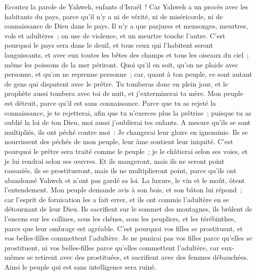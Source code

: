 \begin{multicols}{2}
\VerseOne{}Ecoutez la parole de Yahweh, enfants d'Israël~! Car Yahweh a un procès avec les habitants du pays, parce qu'il n'y a ni de vérité, ni de miséricorde, ni de connaissance de Dieu dans le pays.
Il n'y a que parjures et mensonges, meurtres, vols et adultères~; on use de violence, et un meurtre touche l'autre.
C'est pourquoi le pays sera dans le deuil, et tous ceux qui l'habitent seront languissants, et avec eux toutes les bêtes des champs et tous les oiseaux du ciel~; même les poissons de la mer périront.
Quoi qu'il en soit, qu'on ne plaide avec personne, et qu'on ne reprenne personne~; car, quant à ton peuple, ce sont autant de gens qui disputent avec le prêtre.
Tu tomberas donc en plein jour, et le prophète aussi tombera avec toi de nuit, et j'exterminerai ta mère.
Mon peuple est détruit, parce qu'il est sans connaissance. Parce que tu as rejeté la connaissance, je te rejetterai, afin que tu n'exerces plus la prêtrise~; puisque tu as oublié la loi de ton Dieu, moi aussi j'oublierai tes enfants.
A mesure qu'ils se sont multipliés, ils ont péché contre moi~: Je changerai leur gloire en ignominie.
Ils se nourrissent des péchés de mon peuple, leur âme soutient leur iniquité.
C'est pourquoi le prêtre sera traité comme le peuple~; je le châtierai selon ses voies, et je lui rendrai selon ses œuvres.
Et ils mangeront, mais ils ne seront point rassasiés, ils se prostitueront, mais ils ne multiplieront point, parce qu'ils ont abandonné Yahweh et n'ont pas gardé sa loi.
La luxure, le vin et le moût, ôtent l'entendement.
Mon peuple demande avis à son bois, et son bâton lui répond~; car l'esprit de fornication les a fait errer, et ils ont commis l'adultère en se détournant de leur Dieu.
Ils sacrifient sur le sommet des montagnes, ils brûlent de l'encens sur les collines, sous les chênes, sous les peupliers, et les térébinthes, parce que leur ombrage est agréable. C'est pourquoi vos filles se prostituent, et vos belles-filles commettent l'adultère.
Je ne punirai pas vos filles parce qu'elles se prostituent, ni vos belles-filles parce qu'elles commettent l'adultère, car eux-mêmes se retirent avec des prostituées, et sacrifient avec des femmes débauchées. Ainsi le peuple qui est sans intelligence sera ruiné.

\end{multicols}
